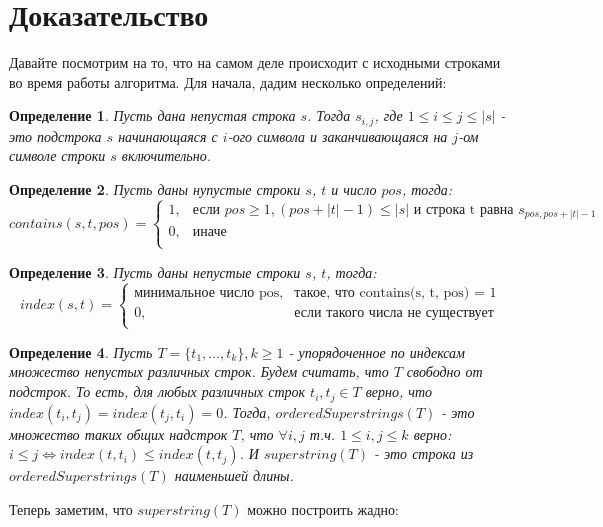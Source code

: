\documentclass[a4paper,10pt]{article}
\newtheorem{definition}{Определение}
\begin{document}
\section{Доказательство}
Давайте посмотрим на то, что на самом деле происходит с исходными строками во время работы алгоритма.
Для начала, дадим несколько определений:

\begin{definition}
Пусть дана непустая строка $s$. 
Тогда $s_{i,j}$, где $1 \leq i \leq j \leq |s|$ - это подстрока $s$ начинающаяся с $i$-ого символа и заканчивающаяся на $j$-ом символе строки $s$ включительно.
\end{definition}

\begin{definition}
Пусть даны нупустые строки $s$, $t$ и число $pos$, тогда:
\[
	contains(s, t, pos) = 
	\left\{ 
		\begin{array}{lcl}
			1, & \mbox{если } pos \geq 1, (pos + |t| - 1) \leq |s| \mbox{ и строка t равна } s_{pos, pos + |t| - 1}\\
			0, & \mbox{иначе}\\ 
		\end{array} 
	\right.
\]
\end{definition}

\begin{definition}
Пусть даны непустые строки $s$, $t$, тогда:
\[
	index(s, t) = 
	\left\{ 
		\begin{array}{lcl}
			\mbox{минимальное число pos}, & \mbox{такое, что contains(s, t, pos) = 1}\\
			0, & \mbox{если такого числа не существует}\\ 
		\end{array} 
	\right.
\]
\end{definition}

\begin{definition}
Пусть $T = \{t_1,\dots,t_k\}, k \geq 1$ - упорядоченное по индексам множество непустых различных строк.
Будем считать, что $T$ свободно от подстрок. 
То есть, для любых различных строк $t_i,t_j \in T$ верно, что $index(t_i, t_j) = index(t_j, t_i) = 0$.
Тогда, $orderedSuperstrings(T)$ - это множество таких общих надстрок $T$, 
что $\forall i,j$ т.ч. $1 \leq i,j \leq k$ верно: $i \leq j \iff index(t, t_i) \leq index(t, t_j)$.
И $superstring(T)$ - это строка из $orderedSuperstrings(T)$ наименьшей длины.
\end{definition}

Теперь заметим, что $superstring(T)$ можно построить жадно:
\end{document}
